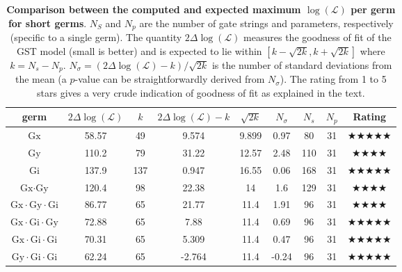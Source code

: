 \documentclass{article}[11pt]
\begin{document}
{\begin{table}[h]
\begin{center}
\begin{tabular}[l]{|c|c|c|c|c|c|c|c|c|}
\hline
germ & $2\Delta\log(\mathcal{L})$ & $k$ & $2\Delta\log(\mathcal{L})-k$ & $\sqrt{2k}$ & $N_\sigma$ & $N_s$ & $N_p$ & Rating \\ \hline
$\mbox{Gx}$ & 58.57 & 49 & 9.574 & 9.899 & 0.97 & 80 & 31 & $\bigstar\bigstar\bigstar\bigstar\bigstar$ \\ \hline
$\mbox{Gy}$ & 110.2 & 79 & 31.22 & 12.57 & 2.48 & 110 & 31 & $\bigstar\bigstar\bigstar\bigstar$ \\ \hline
$\mbox{Gi}$ & 137.9 & 137 & 0.947 & 16.55 & 0.06 & 168 & 31 & $\bigstar\bigstar\bigstar\bigstar\bigstar$ \\ \hline
$\mbox{Gx}\cdot\mbox{Gy}$ & 120.4 & 98 & 22.38 & 14 & 1.6 & 129 & 31 & $\bigstar\bigstar\bigstar\bigstar$ \\ \hline
$\mbox{Gx}\cdot\mbox{Gy}\cdot\mbox{Gi}$ & 86.77 & 65 & 21.77 & 11.4 & 1.91 & 96 & 31 & $\bigstar\bigstar\bigstar\bigstar$ \\ \hline
$\mbox{Gx}\cdot\mbox{Gi}\cdot\mbox{Gy}$ & 72.88 & 65 & 7.88 & 11.4 & 0.69 & 96 & 31 & $\bigstar\bigstar\bigstar\bigstar\bigstar$ \\ \hline
$\mbox{Gx}\cdot\mbox{Gi}\cdot\mbox{Gi}$ & 70.31 & 65 & 5.309 & 11.4 & 0.47 & 96 & 31 & $\bigstar\bigstar\bigstar\bigstar\bigstar$ \\ \hline
$\mbox{Gy}\cdot\mbox{Gi}\cdot\mbox{Gi}$ & 62.24 & 65 & -2.764 & 11.4 & -0.24 & 96 & 31 & $\bigstar\bigstar\bigstar\bigstar\bigstar$ \\ \hline
\end{tabular}

\caption{\textbf{Comparison between the computed and expected maximum $\log(\mathcal{L})$ per germ for short germs}.  $N_S$ and $N_p$ are the number of gate strings and parameters, respectively (specific to a single germ).  The quantity $2\Delta\log(\mathcal{L})$ measures the goodness of fit of the GST model (small is better) and is expected to lie within $[k-\sqrt{2k},k+\sqrt{2k}]$ where $k = N_s-N_p$. $N_\sigma = (2\Delta\log(\mathcal{L})-k)/\sqrt{2k}$ is the number of standard deviations from the mean (a $p$-value can be straightforwardly derived from $N_\sigma$).  The rating from 1 to 5 stars gives a very crude indication of goodness of fit as explained in the text.\label{FitByGermTable}}
\end{center}
\end{table}


}
\end{document}
